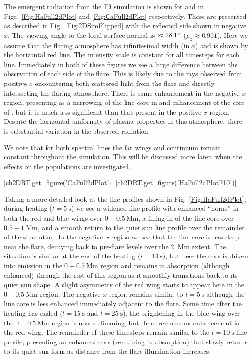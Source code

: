 The emergent radiation from the F9 simulation is shown for \Ha{} and \CaLine{} in Figs.~\ref{Fig:HaFull2dPlot} and \ref{Fig:CaFull2dPlot} respectively.
These are presented as described in Fig.~\ref{Fig:2DSimFlipped} with the reflected side shown in negative $x$.
The viewing angle to the local surface normal is~$\approx18.1\degree$ ($\mu_z\approx0.951$).
Here we assume that the flaring atmosphere has infinitesimal width (in $x$) and is shown by the horizontal red line.
The intensity scale is constant for all timesteps for each line.
Immediately in both of these figures we see a large difference between the observation of each side of the flare.
This is likely due to the rays observed from positive $x$ encountering both scattered light from the flare and directly intersecting the flaring atmosphere.
There is some enhancement in the negative $x$ region, presenting as a narrowing of the line core in \Ha{} and enhancement of the core of \CaLine{}, but it is much less significant than that present in the positive $x$ region.
Despite the horizontal uniformity of plasma properties in this atmosphere, there is substantial variation in the observed radiation.

We note that for both spectral lines the far wings and continuum remain constant throughout the simulation.
This will be discussed more later, when the effects on the populations are investigated.

\def\regiona{$0-\SI{0.5}{\mega\metre}$}

\py[2DRT]|ch2DRT.get_figure('CaFull2dPlot')|
\py[2DRT]|ch2DRT.get_figure('HaFull2dPlotF10')|

Taking a more detailed look at the \Ha{} line profiles shown in Fig.~\ref{Fig:HaFull2dPlot}, during heating ($t=\SI{5}{\second}$) we see a widened line profile with enhanced ``horns'' in both the red and blue wings over $0-\SI{0.5}{\mega\metre}$, a filling-in of the line core over $0.5-\SI{1}{\mega\metre}$, and a smooth return to the quiet sun line profile over the remainder of the simulation.
In the negative $x$ region we see that the line core is less deep near the flare, decaying back to pre-flare levels over the \SI{2}{\mega\metre} extent.
The situation is similar at the end of the heating ($t=\SI{10}{\second}$), but here the core is driven into emission in the $0-\SI{0.5}{\mega\metre}$ region and remains in absorption (although enhanced) through the rest of this region as it smoothly transitions back to its quiet sun shape.
A slight asymmetry of the red wing starts to appear here in the $0-\SI{0.5}{\mega\metre}$ region.
The negative $x$ region remains similar to $t=\SI{5}{\second}$ although the line core is less enhanced immediately adjacent to the flare.
Some time after the heating has ended ($t=\SI{15}{\second}$ and $t=\SI{25}{\second}$), the brightening in the blue wing over the \regiona{} region is now a dimming, but there remains an enhancement in the red wing.
The remainder of these timesteps remain similar to the $t=\SI{10}{\second}$ line profile, presenting an enhanced core (remaining in absorption) that slowly returns to its quiet sun form as distance from the flare illumination increases.

